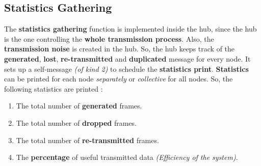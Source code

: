 \subsection{Statistics Gathering}
The \textbf{statistics gathering} function is implemented inside the hub, since the hub is the one controlling the \textbf{whole transmission process}. Also, the \textbf{transmission noise} is created in the hub. So, the hub keeps track of the \textbf{generated}, \textbf{lost}, \textbf{re-transmitted} and \textbf{duplicated} message for every node. It sets up a self-message \emph{(of kind 2)} to schedule the \textbf{statistics print}. \textbf{Statistics} can be printed for each node \emph{separately} or \emph{collective} for all nodes. So, the following statistics are printed :
\begin{enumerate}
    \item The total number of \textbf{generated} frames.
    \item The total number of \textbf{dropped} frames.
    \item The total number of \textbf{re-transmitted} frames.
    \item The \textbf{percentage} of useful transmitted data \emph{(Efficiency of the system)}.
\end{enumerate}

